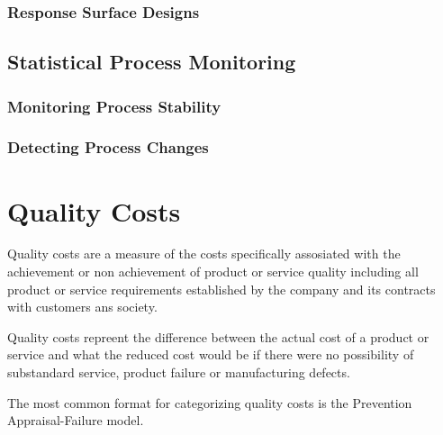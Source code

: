 \documentclass[11pt]{article}
\begin{document}
\hypertarget{response-surface-designs}{%
\subsubsection{Response Surface
Designs}\label{response-surface-designs}}

\hypertarget{statistical-process-monitoring}{%
\subsection{Statistical Process
Monitoring}\label{statistical-process-monitoring}}

\hypertarget{monitoring-process-stability}{%
\subsubsection{Monitoring Process
Stability}\label{monitoring-process-stability}}

\hypertarget{detecting-process-changes}{%
\subsubsection{Detecting Process
Changes}\label{detecting-process-changes}}

    \hypertarget{quality-costs}{%
\section{Quality Costs}\label{quality-costs}}

    Quality costs are a measure of the costs specifically assosiated with
the achievement or non achievement of product or service quality
including all product or service requirements established by the company
and its contracts with customers ans society.

Quality costs repreent the difference between the actual cost of a
product or service and what the reduced cost would be if there were no
possibility of substandard service, product failure or manufacturing
defects.

The most common format for categorizing quality costs is the Prevention
Appraisal-Failure model.
\end{document}

